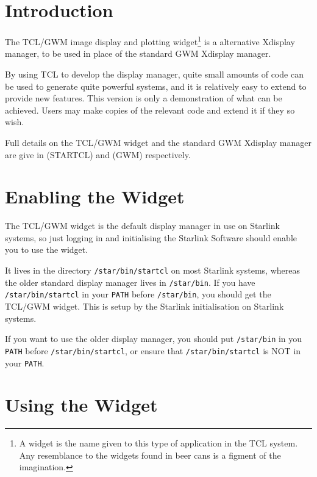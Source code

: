 \documentclass[twoside,11pt,nolof]{starlink}
\begin{document}
\scfrontmatter

\section{\label{introduction}Introduction}

The TCL/GWM image display and plotting widget\footnote{A widget is the
name given to this type of application in the TCL system.  Any resemblance
to the widgets found in beer cans is a figment of the imagination.} is a
alternative Xdisplay manager, to be used in place of the standard
GWM Xdisplay manager.

By using TCL to develop the display manager, quite small amounts of code
can be used to generate quite powerful systems, and it is relatively easy
to extend to provide new features.  This version is only a demonstration of
what can be achieved.  Users may make copies of the relevant code and
extend it if they so wish.

Full details on the TCL/GWM widget and the standard GWM Xdisplay
manager are give in  (STARTCL) and
 (GWM) respectively.

\section{\label{enabling_the_widget}Enabling the Widget}

The TCL/GWM widget is the default display manager in use on Starlink
systems, so just logging in and initialising the Starlink Software should
enable you to use the widget.

It lives in the directory {\tt{/star/bin/startcl}} on most Starlink systems,
whereas the older standard display manager lives in {\tt{/star/bin}}.  If you
have {\tt{/star/bin/startcl}} in your {\tt{PATH}} before {\tt{/star/bin}},
you should get the TCL/GWM widget.  This is setup by the Starlink
initialisation on Starlink systems.

If you want to use the older display manager, you should put {\tt{/star/bin}}
in you {\tt{PATH}} before {\tt{/star/bin/startcl}}, or ensure that
{\tt{/star/bin/startcl}} is NOT in your {\tt{PATH}}.

\section{\label{using_the_widget}Using the Widget}
\end{document}
